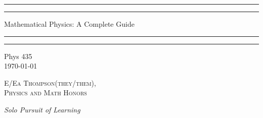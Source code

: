 \documentclass[12pt, a4paper, oneside, openright, titlepage]{book}
\begin{document}

\begin{titlepage}
    \centering
    \scshape
    \vspace*{\baselineskip}
    \rule{\textwidth}{1.6pt}\vspace*{-\baselineskip}\vspace*{2pt}
    \rule{\textwidth}{0.4pt}
    
    \vspace{0.75\baselineskip}
    
    {\LARGE Mathematical Physics: A Complete Guide}
    
    \vspace{0.75\baselineskip}
    
    \rule{\textwidth}{0.4pt}\vspace*{-\baselineskip}\vspace{3.2pt}
    \rule{\textwidth}{1.6pt}
    
    \vspace{2\baselineskip}
    Phys 435 \\
    \vspace*{3\baselineskip}
    \monthdayyeardate\today \\
    \vspace*{5.0\baselineskip}
    
    {\scshape\Large E/Ea Thompson(they/them), \\ Physics and Math Honors\\}
    
    \vspace{1.0\baselineskip}
    \textit{Solo Pursuit of Learning}
    \vfill
    \enlargethispage{1in}
    \begin{figure}[b!]
    \end{figure}
\end{titlepage}
\end{document}
